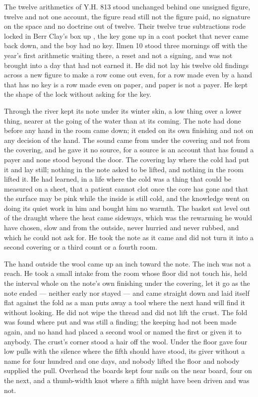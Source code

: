 The twelve arithmetics of Y.H. 813 stood unchanged behind one unsigned figure, twelve and not one account, the figure read still not the figure paid, no signature on the space and no doctrine out of twelve. Their twelve true subtractions rode locked in Berr Clay's box up , the key gone up in a coat pocket that never came back down, and the boy had no key. Ilmen 10 stood three mornings off with the year's first arithmetic waiting there, a reset and not a signing, and was not brought into a day that had not earned it. He did not lay his twelve old findings across a new figure to make a row come out even, for a row made even by a hand that has no key is a row made even on paper, and paper is not a payer. He kept the shape of the lock without asking for the key.

\scenebreak

Through  the river kept its note under its winter skin, a low thing over a lower thing, nearer at the going of the water than at its coming. The note had done before any hand in the room came down; it ended on its own finishing and not on any decision of the hand. The sound came from under the covering and not from the covering, and he gave it no source, for a source is an account that has found a payer and none stood beyond the door. The covering lay where the cold had put it and lay still; nothing in the note asked to be lifted, and nothing in the room lifted it. He had learned, in a life where the cold was a thing that could be measured on a sheet, that a patient cannot clot once the core has gone and that the surface may be pink while the inside is still cold, and the knowledge went on doing its quiet work in him and bought him no warmth. The basket sat level out of the draught where the heat came sideways, which was the rewarming he would have chosen, slow and from the outside, never hurried and never rubbed, and which he could not ask for. He took the note as it came and did not turn it into a second covering or a third count or a fourth room.

The hand outside the wool came up an inch toward the note. The inch was not a reach. He took a small intake from the room whose floor did not touch his, held the interval whole on the note's own finishing under the covering, let it go as the note ended --- neither early nor stayed --- and came straight down and laid itself flat against the fold as a man puts away a tool where the next hand will find it without looking. He did not wipe the thread and did not lift the crust. The fold was found where put and was still a finding; the keeping had not been made again, and no hand had placed a second wool or named the first or given it to anybody. The crust's corner stood a hair off the wool. Under the floor  gave four low pulls with the silence where the fifth should have stood, its giver without a name for four hundred and one days, and nobody lifted the floor and nobody supplied the pull. Overhead the boards kept four nails on the near board, four on the next, and a thumb-width knot where a fifth might have been driven and was not.

